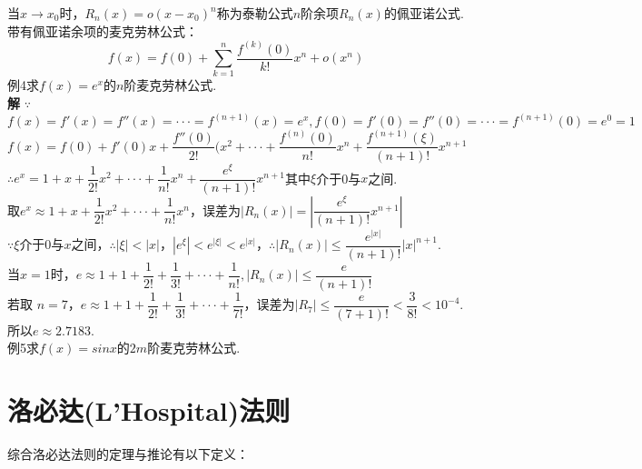 \documentclass[UTF8]{ctexart}
\begin{document}
\begin{CJK}{UTF8}{fs}
\begin{enumerate}[(1)]
当$x\rightarrow x_0$时，$R_n (x)=o(x-x_0)^n$称为泰勒公式$n$阶余项$R_n (x)$的佩亚诺公式.
\\带有佩亚诺余项的麦克劳林公式：$$f(x)=f(0)+\sum_{k=1}^n \frac{f^{(k)}(0)}{k!}x^n+o(x^n)$$
例4\quad 求$f(x)=e^x$的$n$阶麦克劳林公式.
\\ \textbf{解} $\because$ $f(x)=f'(x)=f''(x)=\cdot\cdot\cdot=f^{(n+1)}(x)=e^x,f(0)=f'(0)=f''(0)=\cdot\cdot\cdot=f^{(n+1)}(0)=e^0=1$
\\$f(x)=f(0)+f'(0)x+\dfrac{f''(0)}{2!}(x^2+\cdot \cdot \cdot+\dfrac{f^{(n)}(0)}{n!}x^n+\dfrac{f^{(n+1)}(\xi)}{(n+1)!}x^{n+1}$
\\ $\therefore e^x=1+x+\dfrac{1}{2!}x^2+\cdot\cdot\cdot+\dfrac{1}{n!}x^n+\dfrac{e^\xi}{(n+1)!}x^{n+1}$其中$\xi$介于0与$x$之间.
\\取$e^x \approx 1+x+\dfrac{1}{2!}x^2+\cdot\cdot\cdot+\dfrac{1}{n!}x^n$，误差为$|R_n(x)|=|\dfrac{e^\xi}{(n+1)!}x^{n+1}|$
\\$\because\xi$介于0与$x$之间，$\therefore |\xi|<|x|$，$|e^\xi|<e^{|\xi|}<e^{|x|}$，$\therefore |R_n(x)|\leq \dfrac{e^{|x|}}{(n+1)!}|x|^{n+1}. $
\\当$x=1$时，$e\approx 1+1+\dfrac{1}{2!}+\dfrac{1}{3!}+\cdot\cdot\cdot+\dfrac{1}{n!},|R_n(x)|\leq \dfrac{e}{(n+1)!}$
\\若取 $n=7$，$e\approx 1+1+\dfrac{1}{2!}+\dfrac{1}{3!}+\cdot\cdot\cdot+\dfrac{1}{7!}$，误差为$|R_7|\leq\dfrac{e}{(7+1)!}<\dfrac{3}{8!}<10^{-4}.$所以$e\approx 2.7183.$
\\例5\quad 求$f(x)=sinx$的$2m$阶麦克劳林公式.
\end{enumerate}
\end{CJK}
\vspace{-8mm} \section{洛必达(L’Hospital)法则} \vspace{-2mm} \small 综合洛必达法则的定理与推论有以下定义：
\end{document}
